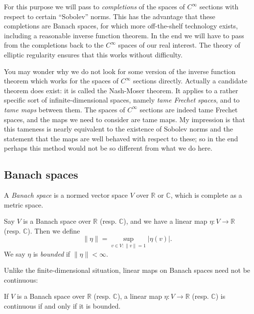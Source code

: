 \documentclass[12pt,letterpaper,reqno]{article}
\numberwithin{equation}{section}
\newcommand{\R}{\ensuremath{\mathbb R}}
\newcommand{\C}{\ensuremath{\mathbb C}}
\newcommand{\abs}[1]{\lvert#1\rvert}
\newcommand{\norm}[1]{\lVert#1\rVert}
\newcommand{\ti}[1]{\textit{#1}}
\begin{document}
For this purpose we will pass to \ti{completions}
of the spaces of $C^\infty$ sections with 
respect to certain ``Sobolev'' norms.
This has the advantage that these completions are Banach spaces, for which 
more off-the-shelf technology exists, including a
reasonable inverse function theorem. In the end we will have to 
pass from the completions back to the $C^\infty$ spaces of
our real interest. The theory of elliptic regularity ensures
that this works without difficulty.

You may wonder why we do not look for some version
of the inverse function theorem which works for the spaces of 
$C^\infty$ sections directly. Actually a candidate theorem 
does exist: it is called the Nash-Moser theorem. It applies 
to a rather specific sort of infinite-dimensional spaces, 
namely \ti{tame Frechet spaces}, and to \ti{tame maps} between them.
The spaces of $C^\infty$ sections are indeed tame Frechet spaces,
and the maps we need to consider are tame maps.
My impression is that this tameness is nearly equivalent to
the existence of Sobolev norms and the statement that the maps 
are well behaved with respect to these; so in the end perhaps
this method would not be so different from what we do here.


\subsection{Banach spaces}

\begin{defn} A \ti{Banach space} is 
a normed vector space $V$ over $\R$ or $\C$, which
is complete as a metric space.
\end{defn}

\begin{defn} Say $V$ is a Banach 
space over $\R$ (resp. $\C$), and we have a 
linear map $\eta: V \to \R$ (resp. $\C$). Then we define
\begin{equation}
  \norm{\eta} = \sup_{v \in V: \norm{v}=1} \abs{\eta(v)}.
\end{equation}
We say $\eta$ is \ti{bounded} if $\norm{\eta} < \infty$.
\end{defn}

Unlike the finite-dimensional situation, linear maps
on Banach spaces need not be continuous:

\begin{prop}[Continuous = bounded] If $V$ is a Banach space
over $\R$ (resp. $\C$), a linear map $\eta: V \to \R$ 
(resp. $\C$) is continuous if and only if it is bounded.
\end{prop}
\end{document}
